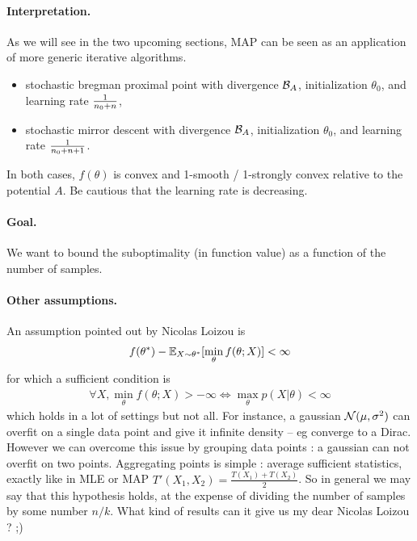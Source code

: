 \documentclass{article}
\newcommand{\logpart}{A}
\newcommand{\bregman}{\cB_\logpart}
\newcommand{\natp}{\theta}
\begin{document}
\paragraph{Interpretation.}
As we will see in the two upcoming sections, MAP can be seen as an application of more generic iterative algorithms. 
\begin{itemize}
	\item stochastic bregman proximal point with divergence $\bregman$, initialization $\natp_0$, and learning rate $\frac{1}{n_0+n}$,
	\item stochastic mirror descent with divergence $\bregman$, initialization $\natp_0$, and learning rate  $\frac{1}{n_0+n +1}$.
\end{itemize}
In both cases, $f(\natp)$ is convex and 1-smooth / 1-strongly convex relative to the potential $\logpart$. Be cautious that the learning rate is decreasing.

\paragraph{Goal.} We want to bound the suboptimality (in function value) as a function of the number of samples. 


\paragraph{Other assumptions.}
An assumption pointed out by Nicolas Loizou is 
\begin{align}
	f(\natp^*) - \E_{X\sim\natp^*}[\min_\natp f(\natp ; X)] < \infty
\end{align}
for which a sufficient condition is 
\begin{align}
\forall X, \min_\natp f(\natp ; X) >	 - \infty \iff \max_\natp p(X|\natp) < \infty
\end{align}
which holds in a lot of settings but not all. For instance, a gaussian ${\mathcal N}(\mu,\sigma^2)$ can overfit on a single data point and give it infinite density -- eg converge to a Dirac. However we can overcome this issue by grouping data points : a gaussian can not overfit on two points. Aggregating points is simple : average sufficient statistics, exactly like in MLE or MAP $T'(X_1,X_2) = \frac{T(X_1) + T(X_2)}{2}$. 
So in general we may say that this hypothesis holds, at the expense of dividing the number of samples by some number $n/k$. What kind of results can it give us my dear Nicolas Loizou ? ;)
\end{document}
